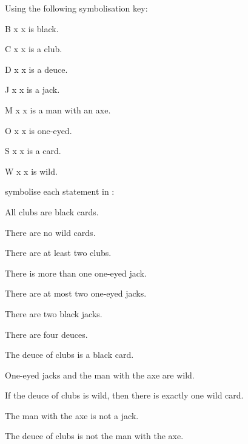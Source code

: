 \documentclass[PHIL101-Textbook.tex]{subfiles}
\begin{document}
\noindent\solutions
\problempart \label{pr.plcards}
Using the following symbolisation key:
\begin{ekey}
\item[\atom B x ] x is black.
\item[\atom C x ] x is a club.
\item[\atom D x ] x is a deuce.
\item[\atom J x ] x is a jack.
\item[\atom M x ] x is a man with an axe.
\item[\atom O {x}] x is one-eyed.
\item[\atom S x ] x is a card.
\item[\atom W x ] x is wild.
\end{ekey}
symbolise each statement in \pl:
\begin{earg}
\item All clubs are black cards.
\item There are no wild cards.
\item There are at least two clubs.
\item There is more than one one-eyed jack.
\item There are at most two one-eyed jacks.
\item There are two black jacks.
\item There are four deuces.
\item The deuce of clubs is a black card.
\item One-eyed jacks and the man with the axe are wild.
\item If the deuce of clubs is wild, then there is exactly one wild card.
\item The man with the axe is not a jack.
\item The deuce of clubs is not the man with the axe.
\end{earg}

\
\end{document}
